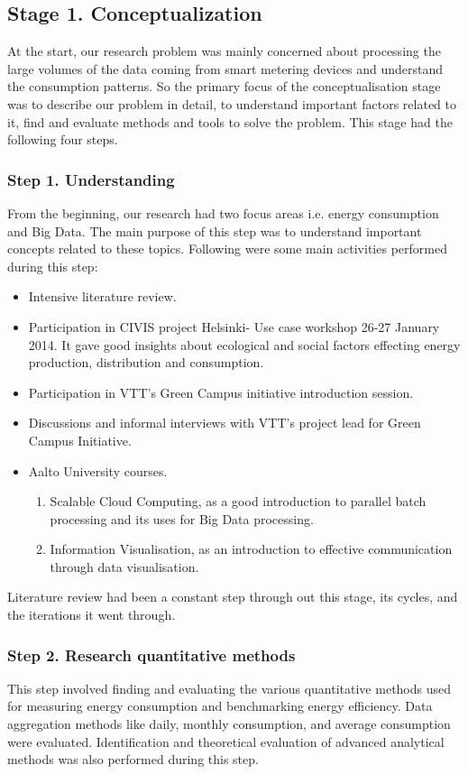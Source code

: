 \subsection{Stage 1. Conceptualization } \label{concept}
At the start, our research problem was mainly concerned about processing the large volumes of the data coming from smart metering devices and understand the consumption patterns. So the primary focus of the conceptualisation stage was to describe our problem in detail, to understand important factors related to it, find and evaluate methods and tools to solve the problem. This stage had the following four steps.
\subsubsection{Step 1. Understanding} 
From the beginning, our research had two focus areas i.e. energy consumption and Big Data. The main purpose of this step was to understand important concepts related to these topics. Following were some main activities performed during this step:
\begin{itemize}
\item Intensive literature review.
\item Participation in CIVIS project Helsinki- Use case workshop 26-27 January 2014. It gave good insights about ecological and social factors effecting energy production, distribution and consumption.
\item Participation in VTT's Green Campus initiative introduction session.
\item Discussions and informal interviews with VTT's project lead for Green Campus Initiative.
\item Aalto University courses.
	\begin{enumerate}
	    \item Scalable Cloud Computing, as a good introduction to parallel batch processing and its uses for Big Data processing.
	    \item Information Visualisation, as an introduction to effective communication through data visualisation.
	  \end{enumerate}      
\end{itemize}

Literature review had been a constant step through out this stage, its cycles, and the iterations it went through.
\subsubsection{Step 2. Research quantitative methods} \label{qm}
This step involved finding and evaluating the various quantitative methods used for measuring energy consumption and benchmarking energy efficiency. Data aggregation methods like daily, monthly consumption, and average consumption were evaluated. Identification and theoretical evaluation of advanced analytical methods was also performed during this step.
